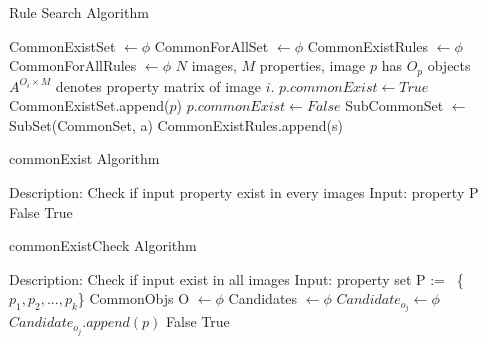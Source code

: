 \begin{algorithm}
	\caption{Rule Search Algorithm} 
	\begin{algorithmic}[1]
		\State CommonExistSet $ \leftarrow \phi $ 
		\State CommonForAllSet $ \leftarrow \phi $ 
		\State CommonExistRules $ \leftarrow \phi $ 
		\State CommonForAllRules $ \leftarrow \phi $ 
		\State $ N $ images, $ M $ properties, image $ p $ has $ O_p $ objects 
		\State $ A^{O_i \times M} $ denotes property matrix of image $ i $.
				\State $ p.commonExist \leftarrow True $
				\State CommonExistSet.append($ p $)
			\Else 
				\State $ p.commonExist\leftarrow False $
			\EndIf
		\EndFor 
			\State SubCommonSet $ \leftarrow $ SubSet(CommonSet, a)
					\State CommonExistRules.append(s) 
				\EndIf
			\EndFor
		\EndFor
	\end{algorithmic} 
\end{algorithm}


\begin{algorithm}
	\caption{commonExist  Algorithm} 
	\begin{algorithmic}[1]
		\State Description: Check if input property exist in every images
		\State Input: property P
				\State \Return False
			\EndIf
		\EndFor
		\State \Return True
	\end{algorithmic} 
\end{algorithm}


\begin{algorithm}
	\caption{commonExistCheck Algorithm} 
	\begin{algorithmic}[1]
		\State Description: Check if input exist in all images
		\State Input: property set P :=  \{$ p_1, p_2,..., p_k $\}
		\State CommonObjs O $ \leftarrow \phi $
		\State Candidates $ \leftarrow \phi $ 
			\State $ Candidate_{o_j} \leftarrow \phi $ 
					\State $ Candidate_{o_j}.append(p) $
				\EndIf
			\EndFor 
		\EndFor 
					\State \Return False
				\EndIf
			\EndFor 
		\EndFor 
		\State \Return True
	\end{algorithmic} 
\end{algorithm}
